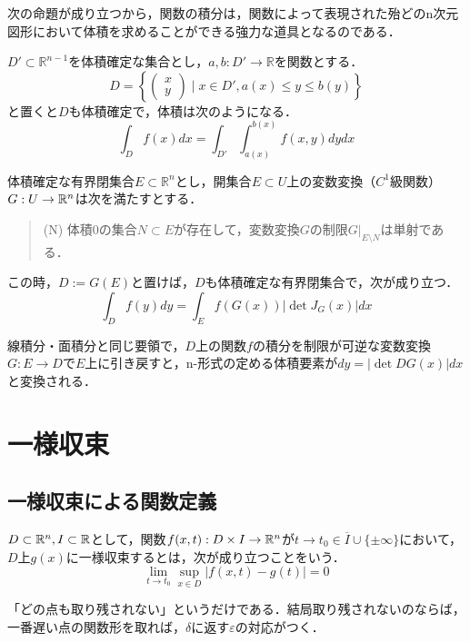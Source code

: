 \documentclass[uplatex, dvipdfmx]{jsreport}
\begin{document}
次の命題が成り立つから，関数の積分は，関数によって表現された殆どのn次元図形において体積を求めることができる強力な道具となるのである．
\begin{proposition}[縦線集合上での積分]
    $D'\subset\mathbb{R}^{n-1}$を体積確定な集合とし，$a,b:D'\to\mathbb{R}$を関数とする．
    \[ D=\left\{ \begin{pmatrix}x\\y\end{pmatrix}\mid x\in D',a(x)\le y\le b(y) \right\} \]
    と置くと$D$も体積確定で，体積は次のようになる．
    \[ \int_Df(x)dx = \int_{D'}\int^{b(x)}_{a(x)}f(x,y)dydx \]
\end{proposition}

\begin{theorem}[変数変換公式]
    体積確定な有界閉集合$E\subset\mathbb{R}^n$とし，開集合$E\subset U$上の変数変換（$C^1$級関数）$G:U\to\mathbb{R}^n$は次を満たすとする．
    \begin{quotation}
        (N) 体積$0$の集合$N\subset E$が存在して，変数変換$G$の制限$G|_{E\setminus N}$は単射である．
    \end{quotation}
    この時，$D:=G(E)$と置けば，$D$も体積確定な有界閉集合で，次が成り立つ．
    \[ \int_Df(y)dy  = \int_Ef(G(x))|\det J_G(x)|dx\]
\end{theorem}
\begin{remark}
    線積分・面積分と同じ要領で，$D$上の関数$f$の積分を制限が可逆な変数変換$G:E\to D$で$E$上に引き戻すと，n-形式の定める体積要素が$dy=|\det DG(x)|dx$と変換される．
\end{remark}

\section{一様収束}

\subsection{一様収束による関数定義}

\begin{definition}
    $D\subset\mathbb{R}^n,I\subset\mathbb{R}$として，関数$f(x,t):D\times I\to\mathbb{R}^n$が$t\to t_0\in \overline{I}\cup\{\pm\infty\}$において，$D$上$g(x)$に一様収束するとは，次が成り立つことをいう．
    \[ \lim_{t\to t_0}\sup_{x\in D}|f(x,t)-g(t)|=0 \]
\end{definition}
\begin{remark}
    「どの点も取り残されない」というだけである．結局取り残されないのならば，一番遅い点の関数形を取れば，$\delta$に返す$\varepsilon$の対応がつく．
\end{remark}
\end{document}
